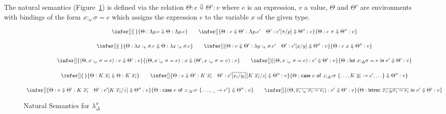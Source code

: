\documentclass[acmsmall,review,anonymous,screen]{acmart}
\newcommand{\llet}[2]{\mathsf{let}~#1~\mathsf{in}~#2}
\newcommand{\lletrec}[2]{\mathsf{letrec}~#1~\mathsf{in}~#2}
\newcommand{\ccase}[2]{\mathsf{case}~#1~\mathsf{of}~#2}
\begin{document}
  
The natural semantics (Figure~\ref{fig:natsemapp}) is defined via the relation
$\Theta : e \Downarrow \Theta' : v$ where $e$ is an expression, $v$ a
value, $\Theta$ and $\Theta'$ are environments with bindings of the
form $x:_\omega\sigma = e$ which assigns the expression $e$ to the
variable $x$ of the given type.

\begin{figure}
\[
  \begin{array}{c}
    \infer[]
    {\,}
    {\Theta : \Lambda p.e \Downarrow \Theta : \Lambda p.e}
    \qquad
    \infer[]
    {\Theta  : e\Downarrow \Theta' : \Lambda p.e' \quad \Theta' :
    e'[\pi/p]\Downarrow \Theta'' : v}
    {\Theta : e~\pi\Downarrow \Theta'' : v }\\[1.5em]
    \infer[]
    {\,}
    {\Theta : \lambda x:_\pi \sigma . e \Downarrow \Theta : \lambda x:_\pi \sigma . e }
    \qquad
    \infer[]
    {\Theta : e \Downarrow \Theta' : \lambda y:_\pi \sigma . e' \quad
    \Theta' : e'[x/y] \Downarrow \Theta'' : v }
    {\Theta : e~x \Downarrow \Theta'' : v}\\[1.5em]
    \infer[]
    {(\Theta , x:_\omega \sigma = e): e \Downarrow \Theta' : v}
    {(\Theta , x:_\omega \sigma = e) : x \Downarrow (\Theta',x:_\omega
    \sigma = v) : v}
    \qquad
    \infer[]
    {(\Theta,x:_\omega \sigma = e) : e' \Downarrow \Theta' : v}
    {\Theta : \llet{x{:}_{\Delta}\sigma = e}{e'}\Downarrow \Theta' : v
    }\\[1.5em]
    \infer[]
    {\,}
    {\Theta : K~\ov{x_i} \Downarrow \Theta : K~\ov{x_i}}
    \qquad
    \infer[]
    {\Theta : e \Downarrow \Theta' : K~\ov{x_i} \quad
    \Theta' : e'\ov{[x_i/y_i]}[K~\ov{x_i}/z] \Downarrow \Theta'' : v }
    {\Theta :
    \ccase{e}{z{:}_{\Delta'}\sigma~\{{\dots,K~\ov{y_i} \to e', {\dots}}\}}
    \Downarrow \Theta'' : v}\\[1.5em]
    \infer[]
    {\Theta : e \Downarrow \Theta' : K~\ov{x_i} \quad
    \Theta' : e'[K~\ov{x_i}/z] \Downarrow \Theta'' : v }
    {\Theta :
    \ccase{e}{z{:}_{\Delta'}\sigma~\{\dots , \_\to
    e'}\} \Downarrow \Theta'' : v}
    \qquad
    \infer[]
    {%
    (\Theta, \overline{x_i:_\omega \sigma_i = e_i}) : e' \Downarrow \Theta'
    : v
    }
    {\Theta : \lletrec{\overline{x_i{:}_{\Delta}\sigma_i = e_i}}{e'}
    \Downarrow \Theta' : v}
    \end{array}
  \]
  \caption{Natural Semantics for $\lambda_\Delta^\pi$\label{fig:natsemapp}}
\end{figure}
\end{document}
